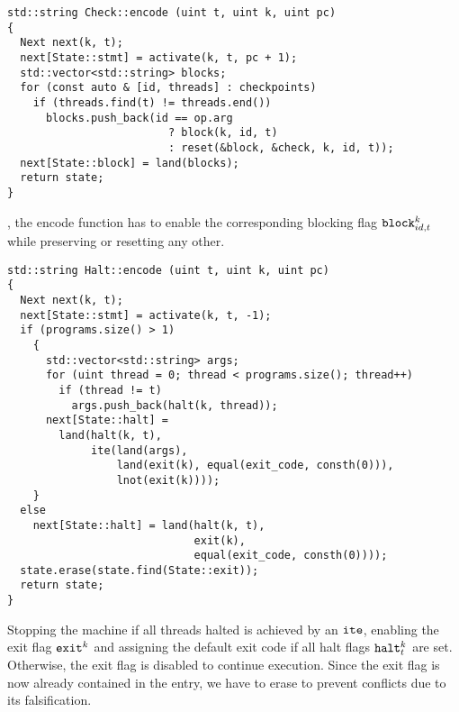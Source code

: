 
\begin{lstlisting}[style=c++, style=encode]
std::string Check::encode (uint t, uint k, uint pc)
{
  Next next(k, t);
  next[State::stmt] = activate(k, t, pc + 1);
  std::vector<std::string> blocks;
  for (const auto & [id, threads] : checkpoints)
    if (threads.find(t) != threads.end())
      blocks.push_back(id == op.arg
                         ? block(k, id, t)
                         : reset(&block, &check, k, id, t));
  next[State::block] = land(blocks);
  return state;
}
\end{lstlisting}

\noindent
{},
the encode function has to enable the corresponding blocking flag $\texttt{block}^k_{id, t}$ while preserving or resetting any other.


\newpage

\begin{lstlisting}[style=c++, style=encode]
std::string Halt::encode (uint t, uint k, uint pc)
{
  Next next(k, t);
  next[State::stmt] = activate(k, t, -1);
  if (programs.size() > 1)
    {
      std::vector<std::string> args;
      for (uint thread = 0; thread < programs.size(); thread++)
        if (thread != t)
          args.push_back(halt(k, thread));
      next[State::halt] =
        land(halt(k, t),
             ite(land(args),
                 land(exit(k), equal(exit_code, consth(0))),
                 lnot(exit(k))));
    }
  else
    next[State::halt] = land(halt(k, t),
                             exit(k),
                             equal(exit_code, consth(0))));
  state.erase(state.find(State::exit));
  return state;
}
\end{lstlisting}

\noindent
Stopping the machine if all threads halted is achieved by an $\texttt{ite}$, enabling the exit flag $\texttt{exit}^k$ and assigning the default exit code if all halt flags $\texttt{halt}^k_t$ are set.
Otherwise, the exit flag is disabled to continue execution.
Since the exit flag is now already contained in the  entry, we have to erase  to prevent conflicts due to its falsification. %

